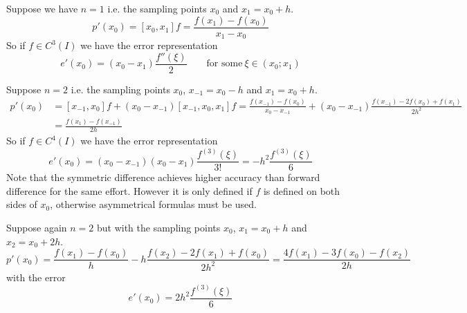 \begin{example}
   Suppose we have \(n = 1\) i.e. the sampling points \(x_0\) and \(x_1 = x_0 + h\).
   \[p'(x_0) = [x_0, x_1]f = \frac{f(x_1) - f(x_0)}{x_1 - x_0}\]
   So if \(f \in C^3(I)\) we have the error representation
   \[e'(x_0) = (x_0 - x_1)\frac{f''(\xi)}{2} \qquad\text{for some}~\xi \in (x_0; x_1)\]
\end{example}

\begin{example}
   Suppose \(n = 2\) i.e. the sampling points \(x_0\), \(x_{-1} = x_0 - h\) and \(x_1 = x_0 + h\).
   \begin{equation*}
      \begin{split}
      p'(x_0) & = [x_{-1}, x_0]f + (x_0 - x_{-1})[x_{-1}, x_0, x_1]f = \frac{f(x_{-1}) - f(x_0)}{x_0 - x_{-1}} + (x_0 - x_{-1})\frac{f(x_{-1}) - 2f(x_0) + f(x_1)}{2h^2}\\
              & = \frac{f(x_1) - f(x_{-1})}{2h}
      \end{split}
   \end{equation*}
   So if \(f \in C^4(I)\) we have the error representation
   \[e'(x_0) = (x_0 - x_{-1})(x_0 - x_1) \frac{f^{(3)}(\xi)}{3!} = -h^2 \frac{f^{(3)}(\xi)}{6}\]
   Note that the symmetric difference achieves higher accuracy than forward difference for the same effort.
   However it is only defined if \(f\) is defined on both sides of \(x_0\), otherwise asymmetrical formulas must be used.
\end{example}

\begin{example}
   Suppose again \(n = 2\) but with the sampling points \(x_0\), \(x_1 = x_0 + h\) and \(x_2 = x_0 + 2h\).
   \[p'(x_0) = \frac{f(x_1) - f(x_0)}{h} - h\frac{f(x_2) - 2f(x_1) + f(x_0)}{2h^2} = \frac{4f(x_1) - 3f(x_0) - f(x_2)}{2h}\]
   with the error
   \[e'(x_0) = 2h^2 \frac{f^{(3)}(\xi)}{6}\]
\end{example}

